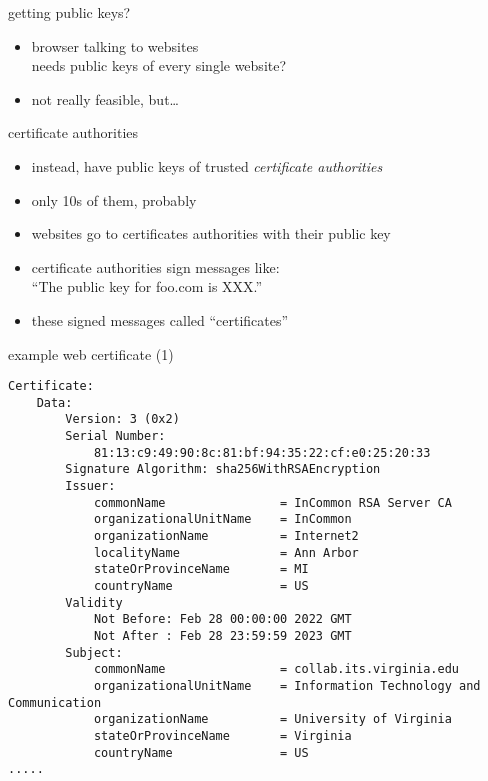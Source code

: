 \begin{frame}{getting public keys?}
    \begin{itemize}
    \item browser talking to websites \\
    needs public keys of every single website?
    \vspace{.5cm}
    \item not really feasible, but\ldots
    \end{itemize}
\end{frame}

\begin{frame}{certificate authorities}
    \begin{itemize}
    \item instead, have public keys of trusted \textit{certificate authorities}
    \item only 10s of them, probably
    \vspace{.5cm}
    \item websites go to certificates authorities with their public key
    \item certificate authorities sign messages like: \\
        ``The public key for foo.com is XXX.''
    \item these signed messages called ``certificates''
    \end{itemize}
\end{frame}

\begin{frame}[fragile]{example web certificate (1)}
\begin{Verbatim}[fontsize=\scriptsize]
Certificate:
    Data:
        Version: 3 (0x2)
        Serial Number:
            81:13:c9:49:90:8c:81:bf:94:35:22:cf:e0:25:20:33
        Signature Algorithm: sha256WithRSAEncryption
        Issuer:
            commonName                = InCommon RSA Server CA
            organizationalUnitName    = InCommon
            organizationName          = Internet2
            localityName              = Ann Arbor
            stateOrProvinceName       = MI
            countryName               = US
        Validity
            Not Before: Feb 28 00:00:00 2022 GMT
            Not After : Feb 28 23:59:59 2023 GMT
        Subject:
            commonName                = collab.its.virginia.edu
            organizationalUnitName    = Information Technology and Communication
            organizationName          = University of Virginia
            stateOrProvinceName       = Virginia
            countryName               = US
.....
\end{Verbatim}
\end{frame}

